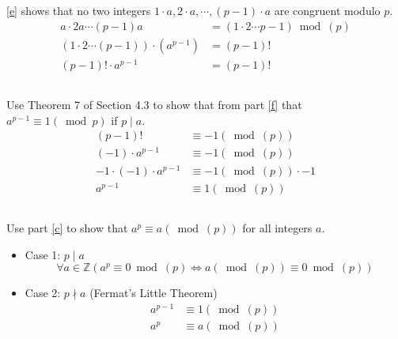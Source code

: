 \documentclass{article}
\begin{document}
\ref{e} shows that no two integers $ 1 \cdot a, 2 \cdot a, \cdots, (p - 1) \cdot a $ are congruent modulo $ p $.
\begin{align*}
	a \cdot 2a \cdots (p - 1)a                   & = (1 \cdot 2 \cdots p - 1) \bmod(p) \\
	(1 \cdot 2 \cdots (p - 1)) \cdot (a^{p - 1}) & = (p - 1)!                          \\
	(p - 1)! \cdot a^{p - 1}                     & = (p - 1)!
\end{align*}

\subsection{}

Use Theorem 7 of Section 4.3 to show that from part \ref{f} that $ a^{p - 1} \equiv 1(\bmod{p}) $ if $ p \mid a $.
\begin{align*}
	(p - 1)!                      & \equiv -1 (\bmod(p))         \\
	(-1) \cdot a^{p - 1}          & \equiv -1(\bmod(p))          \\
	-1 \cdot (-1) \cdot a^{p - 1} & \equiv -1(\bmod(p)) \cdot -1 \\
	a^{p - 1}                     & \equiv 1(\bmod(p))
\end{align*}

\subsection{}

Use part \ref{c} to show that $ a^{p} \equiv a(\bmod(p)) $ for all integers $ a $.
\begin{itemize}
	\item Case 1: $ p \mid a $
	      \begin{equation*}
		      \forall a \in \mathbb{Z} (a^{p} \equiv 0 \bmod(p) \iff a(\bmod(p)) \equiv 0 \bmod(p))
	      \end{equation*}
	\item Case 2: $ p \nmid a $ (Fermat's Little Theorem)
	      \begin{align*}
		      a^{p - 1} & \equiv 1(\bmod(p)) \\
		      a^p       & \equiv a(\bmod(p))
	      \end{align*}
\end{itemize}
\end{document}
